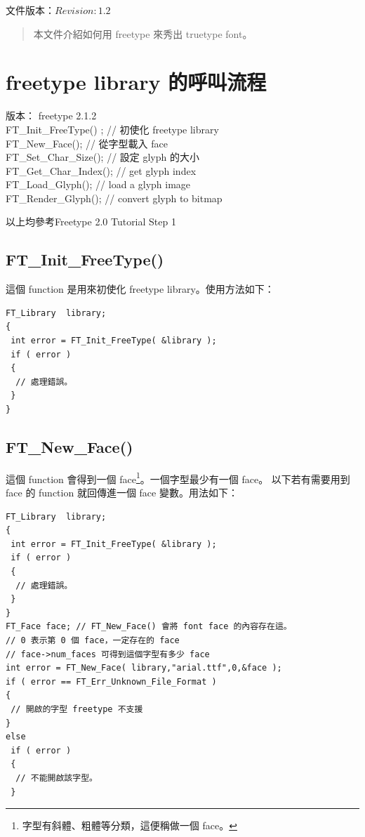 \documentclass[12pt,a4]{article}
\begin{document}
\begin{CJK}{UTF8}{bsmi} %
\renewcommand{\abstractname}{摘要}
\renewcommand{\figurename}{圖}
\renewcommand{\contentsname}{目錄}

文件版本：$Revision: 1.2 $
\newpage
\tableofcontents
{}
\newpage


\begin{abstract}
本文件介紹如何用 freetype 來秀出 truetype font。
\end{abstract}
\newpage
\section{freetype library 的呼叫流程}
版本： freetype 2.1.2\\
FT\_{}Init\_{}FreeType() ; // 初使化 freetype library\\
FT\_{}New\_{}Face(); // 從字型載入 face\\
FT\_{}Set\_{}Char\_{}Size(); // 設定 glyph 的大小\\
FT\_{}Get\_{}Char\_{}Index(); // get glyph index\\
FT\_{}Load\_{}Glyph(); // load a glyph image\\
FT\_{}Render\_{}Glyph(); // convert glyph to bitmap

以上均參考\cite{ftdocs}Freetype 2.0 Tutorial Step 1
\subsection{FT\_{}Init\_{}FreeType()}
這個 function 是用來初使化 freetype library。使用方法如下：\\
\begin{Verbatim}[commandchars=@\[\]]
FT_Library  library;
{
 int error = FT_Init_FreeType( &library );
 if ( error )
 {
  // 處理錯誤。
 }
}
\end{Verbatim}
\subsection{FT\_{}New\_{}Face()}
這個 function 會得到一個 face\footnote{字型有斜體、粗體等分類，這便稱做一個 face。}。一個字型最少有一個 face。
以下若有需要用到 face 的 function 就回傳進一個 face 變數。用法如下：
\begin{Verbatim}[commandchars=@\[\]]
FT_Library  library;
{
 int error = FT_Init_FreeType( &library );
 if ( error )
 {
  // 處理錯誤。
 }
}
FT_Face face; // FT_New_Face() 會將 font face 的內容存在這。
// 0 表示第 0 個 face，一定存在的 face
// face->num_faces 可得到這個字型有多少 face
int error = FT_New_Face( library,"arial.ttf",0,&face );
if ( error == FT_Err_Unknown_File_Format )
{
 // 開啟的字型 freetype 不支援
}
else 
 if ( error )
 {
  // 不能開啟該字型。
 }
\end{Verbatim}

\end{CJK}
\end{document}
